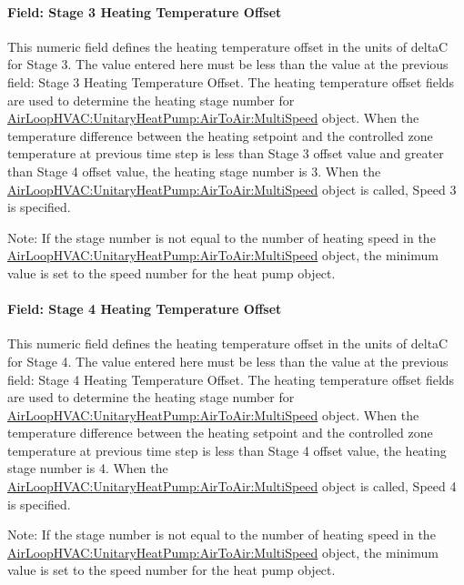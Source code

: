 \paragraph{Field: Stage 3 Heating Temperature Offset}\label{field-stage-3-heating-temperature-offset}

This numeric field defines the heating temperature offset in the units of deltaC for Stage 3. The value entered here must be less than the value at the previous field: Stage 3 Heating Temperature Offset. The heating temperature offset fields are used to determine the heating stage number for \hyperref[airloophvacunitaryheatpumpairtoairmultispeed]{AirLoopHVAC:UnitaryHeatPump:AirToAir:MultiSpeed} object. When the temperature difference between the heating setpoint and the controlled zone temperature at previous time step is less than Stage 3 offset value and greater than Stage 4 offset value, the heating stage number is 3. When the \hyperref[airloophvacunitaryheatpumpairtoairmultispeed]{AirLoopHVAC:UnitaryHeatPump:AirToAir:MultiSpeed} object is called, Speed 3 is specified.

Note: If the stage number is not equal to the number of heating speed in the \hyperref[airloophvacunitaryheatpumpairtoairmultispeed]{AirLoopHVAC:UnitaryHeatPump:AirToAir:MultiSpeed} object, the minimum value is set to the speed number for the heat pump object.

\paragraph{Field: Stage 4 Heating Temperature Offset}\label{field-stage-4-heating-temperature-offset}

This numeric field defines the heating temperature offset in the units of deltaC for Stage 4. The value entered here must be less than the value at the previous field: Stage 4 Heating Temperature Offset. The heating temperature offset fields are used to determine the heating stage number for \hyperref[airloophvacunitaryheatpumpairtoairmultispeed]{AirLoopHVAC:UnitaryHeatPump:AirToAir:MultiSpeed} object. When the temperature difference between the heating setpoint and the controlled zone temperature at previous time step is less than Stage 4 offset value, the heating stage number is 4. When the \hyperref[airloophvacunitaryheatpumpairtoairmultispeed]{AirLoopHVAC:UnitaryHeatPump:AirToAir:MultiSpeed} object is called, Speed 4 is specified.

Note: If the stage number is not equal to the number of heating speed in the \hyperref[airloophvacunitaryheatpumpairtoairmultispeed]{AirLoopHVAC:UnitaryHeatPump:AirToAir:MultiSpeed} object, the minimum value is set to the speed number for the heat pump object.

